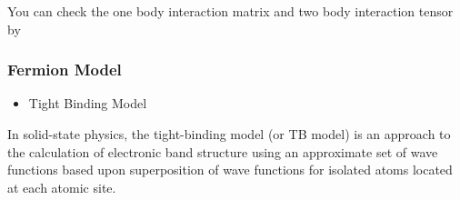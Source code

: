 \documentclass[letterpaper,10pt,english]{sphinxmanual}
\begin{document}
%
\begin{sphinxVerbatim}[commandchars=\\\{\}]
\PYG{p}{[}\PYG{p}{]}\PYG{p}{[}\PYG{p}{]}\PYG{p}{[}\PYG{p}{]}

\PYG{p}{[}\PYG{p}{]}\PYG{p}{[}\PYG{p}{]}\PYG{p}{[}\PYG{p}{]}
\end{sphinxVerbatim}

You can check the one body interaction matrix and two body interaction tensor by

%
\begin{sphinxVerbatim}[commandchars=\\\{\}]

\end{sphinxVerbatim}


\subsubsection{Fermion Model}
\label{\detokenize{user_model_system:fermion-model}}\begin{itemize}
\item {} 
Tight Binding Model

\end{itemize}

In solid-state physics, the tight-binding model (or TB model) is an approach to the calculation
of electronic band structure using an approximate set of wave functions based upon superposition
of wave functions for isolated atoms located at each atomic site.
\end{document}
